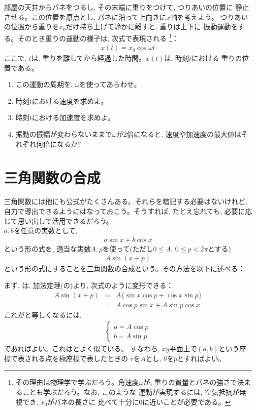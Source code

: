 \begin{q}\label{q:trig_osci} 部屋の天井からバネをつるし, その末端に重りをつけて, つりあいの位置に
静止させる。この位置を原点とし, バネに沿って上向きに$x$軸を考えよう。
つりあいの位置から重りを$x_0$だけ持ち上げて静かに離すと, 重りは上下に
振動運動をする。そのとき重りの運動の様子は, 次式で表現される
\footnote{その理由は物理学で学ぶだろう。角速度$\omega$が, 
重りの質量とバネの強さで決まることも学ぶだろう。なお, このような
運動が実現するには, 空気抵抗が無視でき, $x_0$がバネの長さに
比べて十分に0に近いことが必要である。}：
\begin{eqnarray}x(t)=x_0\cos\omega t\end{eqnarray}
ここで, $t$は, 重りを離してから経過した時間。$x(t)$は, 時刻$t$における
重りの位置である。
\begin{enumerate}
\item この運動の周期を, $\omega$を使ってあらわせ。
\item 時刻$t$における速度を求めよ。
\item 時刻$t$における加速度を求めよ。
\item 振動の振幅が変わらないままで$\omega$が2倍になると, 速度や加速度の最大値はそれぞれ何倍になるか? 
\end{enumerate}\end{q}
\vv


\section{三角関数の合成}

三角関数には他にも公式がたくさんある。それらを暗記する必要はないけれど, 
自力で導出できるようにはなっておこう。そうすれば, たとえ忘れても, 
必要に応じて思い出して活用できるだろう。\\

$a, b$を任意の実数として, 
\begin{eqnarray}a \sin x + b \cos x\label{eq:trigsynth1}\end{eqnarray}
という形の式を, 適当な実数$A, p$を使って(ただし$0\leq A$, $0\leq p<2\pi$とする)
\begin{eqnarray}A \sin (x + p)\label{eq:trigsynth2}\end{eqnarray}
という形の式にすることを\underline{三角関数の合成}という。その方法を以下に述べる：

まず, は, 加法定理(の)より, 次式のように変形できる：
\begin{eqnarray*}
A \sin (x + p)&=&A\{\sin x \cos p+\cos x \sin p\}\\
&=&A\cos p\sin x +A\sin p \cos x 
\end{eqnarray*}
これがと等しくなるには, 
\begin{eqnarray}\begin{cases}
a = A \cos p\label{eq:trigsynth3}\\
b = A \sin p
\end{cases}\end{eqnarray}
であればよい。これはとよく似ている。
すなわち, $xy$平面上で$(a, b)$という座標で表される点を極座標で表したときの
$r$を$A$とし, $\theta$を$p$とすればよい。

